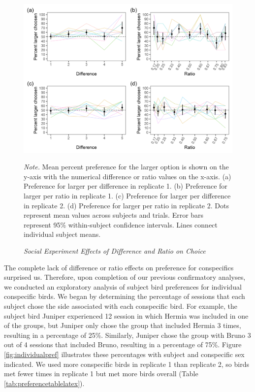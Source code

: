 \documentclass[
  ,pub,floatsintext]{apa6}
\begin{document}
\begin{figure}[t]
\caption{\newline \emph{Social Experiment Effects of Difference and Ratio on Choice} \label{fig:socialgraphs}}
\begin{center}
\includegraphics[width=\linewidth]{"figures/social_figure.png"}
\end{center}

\textit{Note.} Mean percent preference for the larger option is shown on the y-axis with the numerical difference or ratio values on the x-axis. (a) Preference for larger per difference in replicate 1.  (b) Preference for larger per ratio in replicate 1. (c) Preference for larger per difference in replicate 2. (d) Preference for larger per ratio in replicate 2. Dots represent mean values across subjects and trials. Error bars represent 95\% within-subject confidence intervals. Lines connect individual subject means.
\end{figure}

The complete lack of difference or ratio effects on preference for conspecifics surprised us. Therefore, upon completion of our previous confirmatory analyses, we conducted an exploratory analysis of subject bird preferences for individual conspecific birds. We began by determining the percentage of sessions that each subject chose the side associated with each conspecific bird. For example, the subject bird Juniper experienced 12 session in which Hermia was included in one of the groups, but Juniper only chose the group that included Hermia 3 times, resulting in a percentage of 25\%. Similarly, Juniper chose the group with Bruno 3 out of 4 sessions that included Bruno, resulting in a percentage of 75\%. Figure \ref{fig:individualpref} illustrates these percentages with subject and conspecific sex indicated. We used more conspecific birds in replicate 1 than replicate 2, so birds met fewer times in replicate 1 but met more birds overall (Table \ref{tab:preferencetablelatex}).
\end{document}

